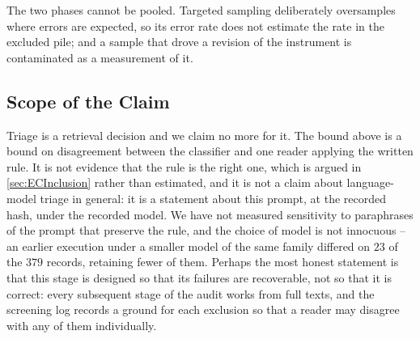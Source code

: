 The two phases cannot be pooled. Targeted sampling deliberately oversamples where errors are
expected, so its error rate does not estimate the rate in the excluded pile; and a sample that drove
a revision of the instrument is contaminated as a measurement of it.

\subsection{Scope of the Claim}

Triage is a retrieval decision and we claim no more for it. The bound above is a bound on
disagreement between the classifier and one reader applying the written rule. It is not evidence that
the rule is the right one, which is argued in \cref{sec:ECInclusion} rather than estimated, and it is
not a claim about language-model triage in general: it is a statement about this prompt, at the
recorded hash, under the recorded model. We have not measured sensitivity to paraphrases of the
prompt that preserve the rule, and the choice of model is not innocuous -- an earlier execution under
a smaller model of the same family differed on \(23\) of the \(379\) records, retaining fewer of
them. Perhaps the most honest statement is that this stage is designed so that its failures are
recoverable, not so that it is correct: every subsequent stage of the audit works from full texts,
and the screening log records a ground for each exclusion so that a reader may disagree with any of
them individually.
